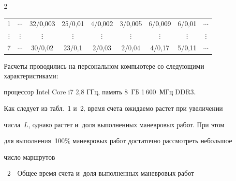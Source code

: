 \begin{multicols}{2}
\begin{table}
\begin{center}
\begin{tabular}{|c|c|c|c|c|c|c|c|c|}
1&$\cdots$&32/0,003&25/0,01&4/0,002&3/0,005&6/0,009&6/0,01&$\cdots$\\


$\vdots$&$\vdots$&$\vdots$&$\vdots$&$\vdots$&$\vdots$&$\vdots$&$\vdots$&$\vdots$\\


7&$\cdots$&30/0,02&23/0,1&2/0,03&2/0,04&4/0,17&5/0,11&$\cdots$\\


\hline


\end{tabular}


\end{center}


\end{table}


      


Расчеты проводились на персональном компьютере со следующими характеристиками: 


процессор Intel Core i7 2,8 ГГц, память 8~ГБ 1\,600~МГц DDR3.


      


Как следует из табл.~1 и~2, время счета ожидаемо растет при увеличении 


числа~$L$, однако рас\-тет и~доля выполненных маневровых работ. При этом 


для выполнения~100\% маневровых работ достаточно рассмотреть небольшое 


число маршрутов\linebreak


\vspace*{-12pt}







{ %


      


 \noindent


{{\tablename~2}\ \ \small{Общее время счета и~доля выполненных маневровых работ}}





 \tabcolsep=13pt


 \begin{center}


\small


\begin{tabular}{|c|c|c|}



\end{tabular}
\end{center}}
\end{multicols}
